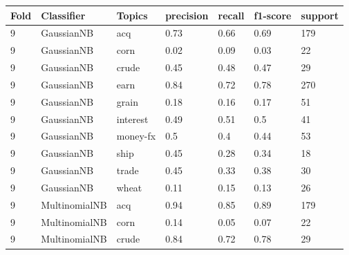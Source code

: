 \documentclass{article}
\begin{document}
\begin{table}[h]
\begin{tabular}{lllllll}
\textbf{Fold} & \textbf{Classifier}    & \textbf{Topics} & \textbf{precision} & \textbf{recall} & \textbf{f1-score} & \textbf{support} \\ \hline
9             & GaussianNB             & acq             & 0.73               & 0.66            & 0.69              & 179              \\
9             & GaussianNB             & corn            & 0.02               & 0.09            & 0.03              & 22               \\
9             & GaussianNB             & crude           & 0.45               & 0.48            & 0.47              & 29               \\
9             & GaussianNB             & earn            & 0.84               & 0.72            & 0.78              & 270              \\
9             & GaussianNB             & grain           & 0.18               & 0.16            & 0.17              & 51               \\
9             & GaussianNB             & interest        & 0.49               & 0.51            & 0.5               & 41               \\
9             & GaussianNB             & money-fx        & 0.5                & 0.4             & 0.44              & 53               \\
9             & GaussianNB             & ship            & 0.45               & 0.28            & 0.34              & 18               \\
9             & GaussianNB             & trade           & 0.45               & 0.33            & 0.38              & 30               \\
9             & GaussianNB             & wheat           & 0.11               & 0.15            & 0.13              & 26               \\
9             & MultinomialNB          & acq             & 0.94               & 0.85            & 0.89              & 179              \\
9             & MultinomialNB          & corn            & 0.14               & 0.05            & 0.07              & 22               \\
9             & MultinomialNB          & crude           & 0.84               & 0.72            & 0.78              & 29               \\

\end{tabular}
\end{table}
\end{document}
